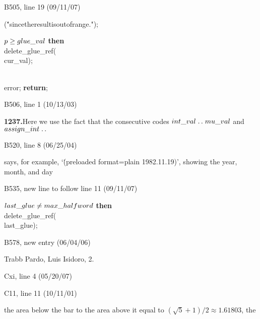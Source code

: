 {{\bugonpage B505, line 19 (09/11/07)

\ninepoint\noindent
\qquad(\.{"since\]the\]result\]is\]out\]of\]range."});\par\noindent
{} $p\ge\\{glue\_val}$ {\bf then}
   \\{delete\_glue\_ref}(\\{cur\_val});\par\noindent
\qquad\\{error}; {\bf return};

\bugonpage B506, line 1 (10/13/03)

\tenpoint\noindent
{\bf 1237.\quad}Here we use the fact that the consecutive codes
$\\{int\_val}\to\\{mu\_val}$ and
$\\{assign\_int}\to$\cutpar

\bugonpage B520, line 8 (06/25/04)

\tenpoint\noindent
says,
for example, `\.{(preloaded format=plain 1982.11.19)}', showing the year,
month, and day\cutpar

\bugonpage B535, new line to follow line 11 (09/11/07)

\ninepoint\noindent
{} $\\{last\_glue}\ne\\{max\_halfword}$ {\bf then}
 \\{delete\_glue\_ref}(\\{last\_glue});

\bugonpage B578, new entry (06/04/06)

\eightpoint\noindent
Trabb Pardo, Luis Isidoro, 2.

\hsize=29pc
\def\\#1{\hbox{\it#1\/\kern.05em}} %
\def\ddashto{\mathrel{\hbox{-\thinspace-\thinspace-\kern-.05em}}}
\def\tension{\mathop{\rm tension}}
\def\controls{\mathop{\rm controls}}
\def\and{\,{\rm and}\,}

\bugonpage Cxi, line 4 (05/20/07)


\bugonpage C11, line 11 (10/11/01)

\noindent
the area below the bar to the area above it equal to
$(\sqrt5+1)/2\approx1.61803$, the\cutpar

}}
